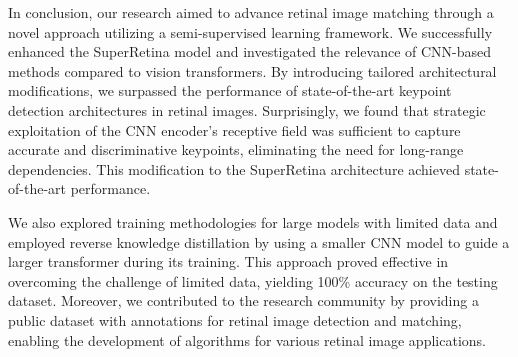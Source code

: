 \documentclass[10pt,twocolumn,letterpaper]{article}
\begin{document}
In conclusion, our research aimed to advance retinal image matching through a novel approach utilizing a semi-supervised learning framework. We successfully enhanced the SuperRetina model and investigated the relevance of CNN-based methods compared to vision transformers. By introducing tailored architectural modifications, we surpassed the performance of state-of-the-art keypoint detection architectures in retinal images. Surprisingly, we found that strategic exploitation of the CNN encoder's receptive field was sufficient to capture accurate and discriminative keypoints, eliminating the need for long-range dependencies. This modification to the SuperRetina architecture achieved state-of-the-art performance.

We also explored training methodologies for large models with limited data and employed reverse knowledge distillation by using a smaller CNN model to guide a larger transformer during its training. This approach proved effective in overcoming the challenge of limited data, yielding 100\% accuracy on the testing dataset. Moreover, we contributed to the research community by providing a public dataset with annotations for retinal image detection and matching, enabling the development of algorithms for various retinal image applications.
\end{document}
